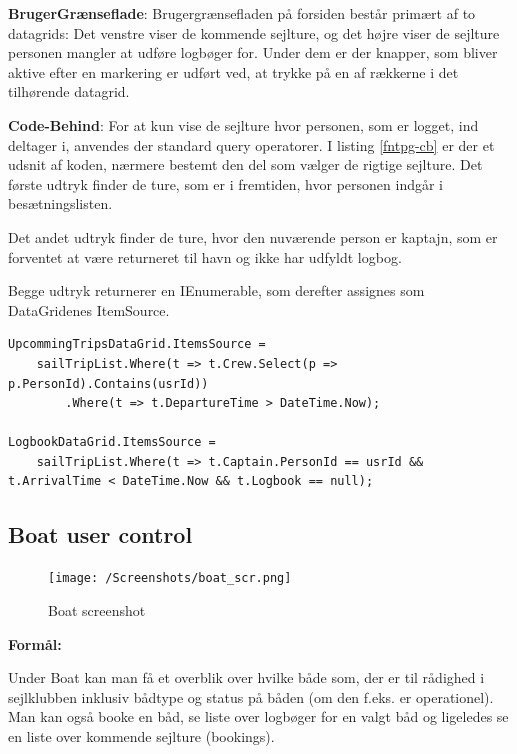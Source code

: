 \textbf{BrugerGrænseflade}: 
Brugergrænsefladen på forsiden består primært af to datagrids: Det venstre viser de kommende sejlture, og det højre viser de sejlture personen mangler at udføre logbøger for. 
Under dem er der knapper, som bliver aktive efter en markering er udført ved, at trykke på en af rækkerne i det tilhørende datagrid.

\textbf{Code-Behind}: 
For at kun vise de sejlture hvor personen, som er logget, ind deltager i, anvendes der standard query operatorer. 
I listing \ref{fntpg-cb} er der et udsnit af koden, nærmere bestemt den del som vælger de rigtige sejlture.
Det første udtryk finder de ture, som er i fremtiden, hvor personen indgår i besætningslisten.

Det andet udtryk finder de ture, hvor den nuværende person er kaptajn, som er forventet at være returneret til havn og ikke har udfyldt logbog. 

Begge udtryk returnerer en IEnumerable, som derefter assignes som DataGridenes ItemSource.

\begin{lstlisting}[frame=single, caption=Forsidens Code-Behind, label=fntpg-cb]
UpcommingTripsDataGrid.ItemsSource =
    sailTripList.Where(t => t.Crew.Select(p => p.PersonId).Contains(usrId))
        .Where(t => t.DepartureTime > DateTime.Now);

LogbookDataGrid.ItemsSource =
    sailTripList.Where(t => t.Captain.PersonId == usrId && t.ArrivalTime < DateTime.Now && t.Logbook == null);
\end{lstlisting}

\subsection{Boat user control}

\begin{figure}
    \label{img:boat_scr}
    \vspace{-20pt}
    \begin{center}
        \texttt{[image: /Screenshots/boat\_scr.png]}
    \end{center}
    \vspace{-20pt}
    \caption{Boat screenshot}
    \vspace{-10pt}
\end{figure}

\textbf{Formål:}

Under Boat kan man få et overblik over hvilke både som, der er til rådighed i sejlklubben inklusiv bådtype og status på båden (om den f.eks. er operationel). 
Man kan også booke en båd, se liste over logbøger for en valgt båd og ligeledes se en liste over kommende sejlture (bookings). 

